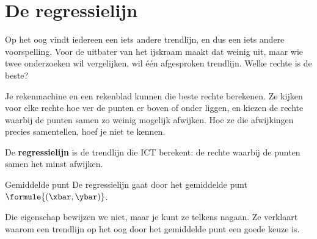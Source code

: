 
\begin{oefeningen}
\end{oefeningen}

\section{De regressielijn}

Op het oog vindt iedereen een iets andere trendlijn, en dus een iets andere voorspelling. Voor de uitbater van het ijskraam maakt dat weinig uit, maar wie twee onderzoeken wil vergelijken, wil één afgesproken trendlijn. Welke rechte is de beste?

Je rekenmachine en een rekenblad kunnen die beste rechte berekenen. Ze kijken voor elke rechte hoe ver de punten er boven of onder liggen, en kiezen de rechte waarbij de punten samen zo weinig mogelijk afwijken. Hoe ze die afwijkingen precies samentellen, hoef je niet te kennen.

\begin{theorie}
De \textbf{\textcolor{accent}{regressielijn}} is de trendlijn die ICT berekent: de rechte waarbij de punten samen het minst afwijken.

\begin{stelling}{Gemiddelde punt}
De regressielijn gaat door het gemiddelde punt $\formule{(\xbar, \ybar)}$.
\end{stelling}
\end{theorie}

Die eigenschap bewijzen we niet, maar je kunt ze telkens nagaan. Ze verklaart waarom een trendlijn op het oog door het gemiddelde punt een goede keuze is.

